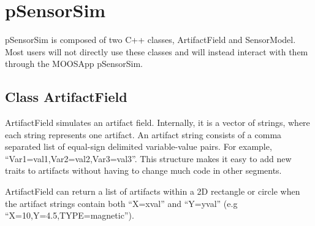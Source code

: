 \section{pSensorSim}
\label{pSensorSim}

pSensorSim is composed of two C++ classes, ArtifactField and SensorModel.  Most users will not directly use these classes and will instead interact with them through the MOOSApp pSensorSim.

\subsection{Class ArtifactField}
\label{classArtifactField}
ArtifactField simulates an artifact field.  Internally, it is a vector of strings, where each string represents one artifact.  An artifact string consists of a comma separated list of equal-sign delimited variable-value pairs.  For example, ``Var1=val1,Var2=val2,Var3=val3''.  This structure makes it easy to add new traits to artifacts without having to change much code in other segments.

ArtifactField can return a list of artifacts within a 2D rectangle or circle when the artifact strings contain both ``X=xval'' and ``Y=yval'' (e.g ``X=10,Y=4.5,TYPE=magnetic'').

